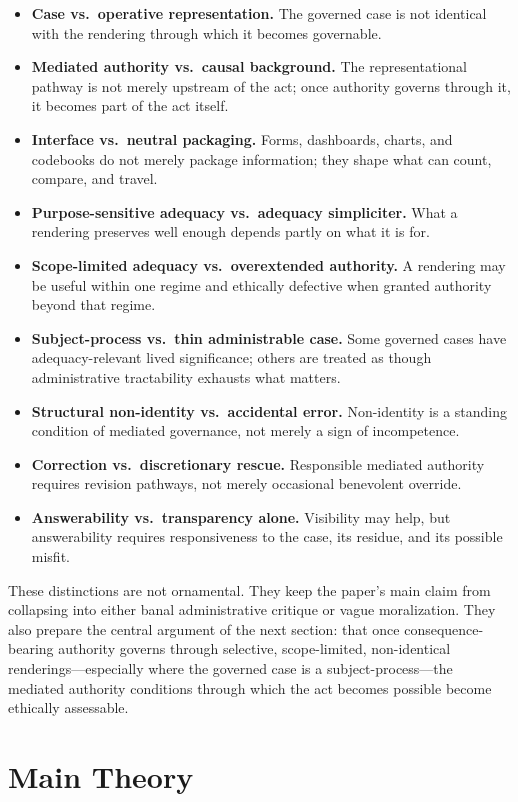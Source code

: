 \documentclass[11pt]{article}
\begin{document}
\begin{itemize}
    \item \textbf{Case vs.\ operative representation.} The governed case is not identical with the rendering through which it becomes governable.
    \item \textbf{Mediated authority vs.\ causal background.} The representational pathway is not merely upstream of the act; once authority governs through it, it becomes part of the act itself.
    \item \textbf{Interface vs.\ neutral packaging.} Forms, dashboards, charts, and codebooks do not merely package information; they shape what can count, compare, and travel.
    \item \textbf{Purpose-sensitive adequacy vs.\ adequacy simpliciter.} What a rendering preserves well enough depends partly on what it is for.
    \item \textbf{Scope-limited adequacy vs.\ overextended authority.} A rendering may be useful within one regime and ethically defective when granted authority beyond that regime.
    \item \textbf{Subject-process vs.\ thin administrable case.} Some governed cases have adequacy-relevant lived significance; others are treated as though administrative tractability exhausts what matters.
    \item \textbf{Structural non-identity vs.\ accidental error.} Non-identity is a standing condition of mediated governance, not merely a sign of incompetence.
    \item \textbf{Correction vs.\ discretionary rescue.} Responsible mediated authority requires revision pathways, not merely occasional benevolent override.
    \item \textbf{Answerability vs.\ transparency alone.} Visibility may help, but answerability requires responsiveness to the case, its residue, and its possible misfit.
\end{itemize}

These distinctions are not ornamental. They keep the paper's main claim from collapsing into either banal administrative critique or vague moralization. They also prepare the central argument of the next section: that once consequence-bearing authority governs through selective, scope-limited, non-identical renderings---especially where the governed case is a subject-process---the mediated authority conditions through which the act becomes possible become ethically assessable.
\section{Main Theory}
\end{document}
